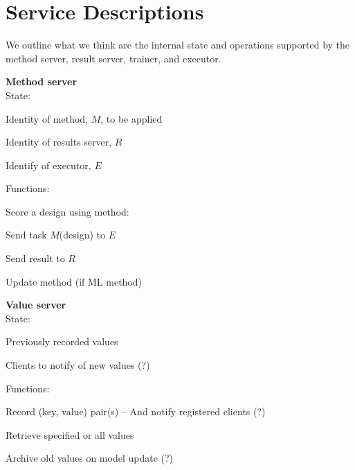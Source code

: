 \documentclass[10pt]{article}
\begin{document}
\appendix
\appendixpage
\section{Service Descriptions}\label{sec:details}

We outline what we think are the internal state and operations supported by the method server, result server, trainer, and executor.

\vspace{3ex}

\noindent
\textbf{Method server}\\
State:
\begin{compactitem}
\item
Identity of method, $M$, to be applied
\item
Identity of results server, $R$
\item
Identify of executor, $E$
\end{compactitem}
Functions:
\begin{compactitem}
\item 
Score a design using method:
\begin{compactitem}
\item
Send task $M$(design) to $E$
\item
Send result to $R$
\end{compactitem}
\item
Update method (if ML method) 
\end{compactitem}

\vspace{3ex}

\noindent
\textbf{Value server}\\
State:
\begin{compactitem}
\item
Previously recorded values
\item
Clients to notify of new values (?)
\end{compactitem}
Functions:
\begin{compactitem}
\item
Record (key, value) pair(s) -- And notify registered clients (?)
\item
Retrieve specified or all values
\item
Archive old values on model update (?)
\end{compactitem}

\vspace{3ex}
\end{document}
